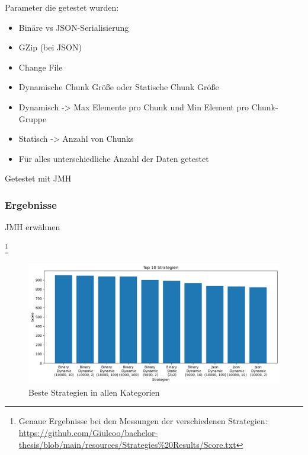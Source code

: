 Parameter die getestet wurden:
\begin{itemize}
    \item Binäre vs JSON-Serialisierung
    \item GZip (bei JSON)
    \item Change File
    \item Dynamische Chunk Größe oder Statische Chunk Größe
    \item Dynamisch -> Max Elemente pro Chunk und Min Element pro Chunk-Gruppe
    \item Statisch -> Anzahl von Chunks 
    \item Für alles unterschiedliche Anzahl der Daten getestet 
\end{itemize}
Getestet mit JMH

\subsubsection{Ergebnisse}
JMH erwähnen

\footnote{Genaue Ergebnisse bei den Messungen der verschiedenen Strategien: \url{https://github.com/Giulcoo/bachelor-thesis/blob/main/resources/Strategies\%20Results/Score.txt}}





\begin{figure}[htp]
    \centering
    \includegraphics[width=1\textwidth]{images/plots/top.png}
    \caption{Beste Strategien in allen Kategorien}
    \label{fig:topStrat}
\end{figure}